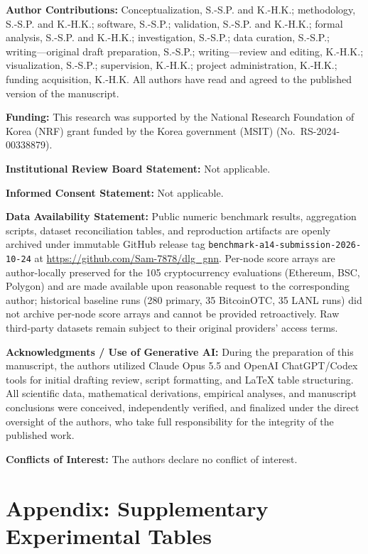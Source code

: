 \documentclass[11pt,a4paper]{article}
\newcommand{\authorcontributions}[1]{\par\medskip\noindent\textbf{Author Contributions: }#1}
\newcommand{\funding}[1]{\par\smallskip\noindent\textbf{Funding: }#1}
\newcommand{\institutionalreview}[1]{\par\smallskip\noindent\textbf{Institutional Review Board Statement: }#1}
\newcommand{\informedconsent}[1]{\par\smallskip\noindent\textbf{Informed Consent Statement: }#1}
\newcommand{\dataavailability}[1]{\par\smallskip\noindent\textbf{Data Availability Statement: }#1}
\newcommand{\conflictsofinterest}[1]{\par\smallskip\noindent\textbf{Conflicts of Interest: }#1}
\begin{document}
\vspace{6pt}

\authorcontributions{Conceptualization, S.-S.P. and K.-H.K.; methodology, S.-S.P. and K.-H.K.; software, S.-S.P.; validation, S.-S.P. and K.-H.K.; formal analysis, S.-S.P. and K.-H.K.; investigation, S.-S.P.; data curation, S.-S.P.; writing---original draft preparation, S.-S.P.; writing---review and editing, K.-H.K.; visualization, S.-S.P.; supervision, K.-H.K.; project administration, K.-H.K.; funding acquisition, K.-H.K. All authors have read and agreed to the published version of the manuscript.}

\funding{This research was supported by the National Research Foundation of Korea (NRF) grant funded by the Korea government (MSIT) (No.~RS-2024-00338879).}

\institutionalreview{Not applicable.}

\informedconsent{Not applicable.}

\dataavailability{Public numeric benchmark results, aggregation scripts, dataset reconciliation tables, and reproduction artifacts are openly archived under immutable GitHub release tag \texttt{benchmark-a14-submission-2026-10-24} at \url{https://github.com/Sam-7878/dlg_gnn}. Per-node score arrays are author-locally preserved for the 105 cryptocurrency evaluations (Ethereum, BSC, Polygon) and are made available upon reasonable request to the corresponding author; historical baseline runs (280 primary, 35 BitcoinOTC, 35 LANL runs) did not archive per-node score arrays and cannot be provided retroactively. Raw third-party datasets remain subject to their original providers' access terms.}

\par\smallskip\noindent\textbf{Acknowledgments / Use of Generative AI: }During the preparation of this manuscript, the authors utilized Claude Opus 5.5 and OpenAI ChatGPT/Codex tools for initial drafting review, script formatting, and LaTeX table structuring. All scientific data, mathematical derivations, empirical analyses, and manuscript conclusions were conceived, independently verified, and finalized under the direct oversight of the authors, who take full responsibility for the integrity of the published work.

\conflictsofinterest{The authors declare no conflict of interest.}




\newpage
\appendix
\section*{Appendix: Supplementary Experimental Tables}
\label{sec:appendix}
\end{document}
